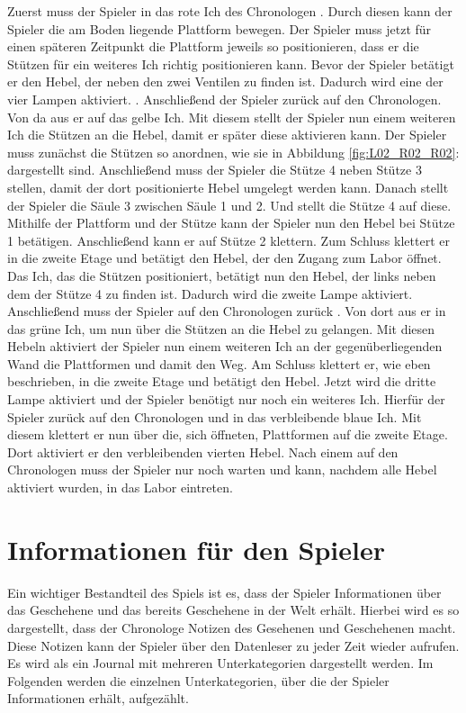 Zuerst muss der Spieler in das rote Ich des Chronologen . Durch diesen kann der Spieler die am Boden liegende Plattform bewegen. Der Spieler muss jetzt für einen späteren Zeitpunkt die Plattform jeweils so positionieren, dass er die Stützen für ein weiteres Ich richtig positionieren kann. Bevor der Spieler  betätigt er den Hebel, der neben den zwei Ventilen zu finden ist. Dadurch wird eine der vier Lampen aktiviert. . Anschließend  der Spieler zurück auf den Chronologen. Von da aus  er auf das gelbe Ich. Mit diesem stellt der Spieler nun einem weiteren Ich die Stützen an die Hebel, damit er später diese aktivieren kann. Der Spieler muss zunächst die Stützen so anordnen, wie sie in Abbildung \ref{fig:L02_R02_R02}:  dargestellt sind. Anschließend muss der Spieler die Stütze 4 neben Stütze 3 stellen, damit der dort positionierte Hebel umgelegt werden kann. Danach stellt der Spieler die Säule 3 zwischen Säule 1 und 2. Und stellt die Stütze 4 auf diese. Mithilfe der Plattform und der Stütze kann der Spieler nun den Hebel bei Stütze 1 betätigen. Anschließend kann er auf Stütze 2 klettern. Zum Schluss klettert er in die zweite Etage und betätigt den Hebel, der den Zugang zum Labor öffnet. Das Ich, das die Stützen positioniert, betätigt nun den Hebel, der links neben dem der Stütze 4 zu finden ist. Dadurch wird die zweite Lampe aktiviert.
Anschließend muss der Spieler auf den Chronologen zurück . Von dort aus  er in das grüne Ich, um nun über die Stützen an die Hebel zu gelangen. Mit diesen Hebeln aktiviert der Spieler nun einem weiteren Ich an der gegenüberliegenden Wand die Plattformen und damit den Weg. Am Schluss klettert er, wie eben beschrieben, in die zweite Etage und betätigt den Hebel. Jetzt wird die dritte Lampe aktiviert und der Spieler benötigt nur noch ein weiteres Ich.
Hierfür  der Spieler zurück auf den Chronologen und  in das verbleibende blaue Ich. Mit diesem klettert er nun über die, sich öffneten, Plattformen auf die zweite Etage. Dort aktiviert er den verbleibenden vierten Hebel. Nach einem  auf den Chronologen muss der Spieler nur noch warten und kann, nachdem alle Hebel aktiviert wurden, in das Labor eintreten.


\section{Informationen für den Spieler}
Ein wichtiger Bestandteil des Spiels ist es, dass der Spieler Informationen über das Geschehene und das bereits Geschehene in der Welt erhält. Hierbei wird es so dargestellt, dass der Chronologe Notizen des Gesehenen und Geschehenen macht. Diese Notizen kann der Spieler über den Datenleser zu jeder Zeit wieder aufrufen. Es wird als ein Journal mit mehreren Unterkategorien dargestellt werden. 
Im Folgenden werden die einzelnen Unterkategorien, über die der Spieler Informationen erhält, aufgezählt.

